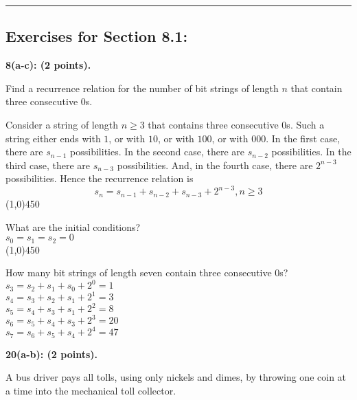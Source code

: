 \documentclass[12pt]{article}  %
\begin{document}
\rule{6in}{.1pt}       %


\subsection*{Exercises for Section 8.1:}     

\noindent
{\bf 8(a-c): (2 points).}

\noindent
Find a recurrence relation for the number of bit strings of length $n$ that contain three consecutive 0s.

\noindent
Consider a string of length $n\geq3$ that contains three consecutive
0s. Such a string either ends with $1$, or with $10$, or with $100$, or
with $000$. In the first case, there are $s_{n-1}$ possibilities. In the
second case, there are $s_{n-2}$ possibilities. In the third case, there
are $s_{n-3}$ possibilities. And, in the fourth case, there are $2^{n-3}$
possibilities. Hence the recurrence relation is
\[s_n=s_{n-1}+s_{n-2}+s_{n-3}+2^{n-3},n\geq3\]
\line(1,0){450}

\noindent
What are the initial conditions?\\
$s_0=s_1=s_2=0$\\
\line(1,0){450}

\noindent
How many bit strings of length seven contain three consecutive 0s?\\
$s_3=s_2+s_1+s_0+2^0=1$\\
$s_4=s_3+s_2+s_1+2^1=3$\\
$s_5=s_4+s_3+s_1+2^2=8$\\
$s_6=s_5+s_4+s_3+2^3=20$\\
$s_7=s_6+s_5+s_4+2^4=47$

\clearpage
\noindent
{\bf 20(a-b): (2 points).}

\noindent
A bus driver pays all tolls, using only nickels and dimes, by throwing one coin at a time into the mechanical toll collector.
\end{document}
